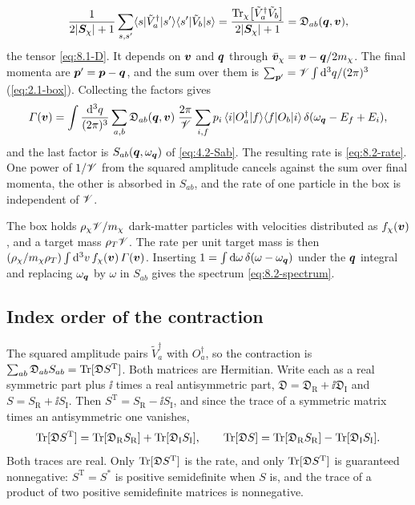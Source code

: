 \begin{equation*}
  \frac{1}{2|\bm{S}_\chi| + 1}\sum_{s,s'}\langle s|\tilde V_a^\dagger|s'\rangle\langle s'|\tilde V_b|s\rangle = \frac{\operatorname{Tr}_\chi\bigl[\tilde V_a^\dagger\tilde V_b\bigr]}{2|\bm{S}_\chi| + 1} = \mathfrak{D}_{ab}(\bm{q},\bm{v}) ,
\end{equation*}
the tensor \cref{eq:8.1-D}. It depends on $\bm{v}$ and $\bm{q}$ through $\bar{\bm{v}}_\chi = \bm{v} - \bm{q}/2m_{\chi}$. The final momenta are $\bm{p}' = \bm{p} - \bm{q}$, and the sum over them is $\sum_{\bm{p}'} = \mathscr{V}\int\mathrm{d}^3q/(2\pi)^3$ (\cref{eq:2.1-box}). Collecting the factors gives
\begin{equation*}
  \varGamma(\bm{v}) = \int\frac{\mathrm{d}^3q}{(2\pi)^3}\sum_{a,b}\mathfrak{D}_{ab}(\bm{q},\bm{v})\;\frac{2\pi}{\mathscr{V}}\sum_{i,f}p_i\,\langle i|O_a^\dagger|f\rangle\langle f|O_b|i\rangle\,\delta(\omega_{\bm{q}} - E_f + E_i) ,
\end{equation*}
and the last factor is $S_{ab}(\bm{q},\omega_{\bm{q}})$ of \cref{eq:4.2-Sab}. The resulting rate is \cref{eq:8.2-rate}. One power of $1/\mathscr{V}$ from the squared amplitude cancels against the sum over final momenta, the other is absorbed in $S_{ab}$, and the rate of one particle in the box is independent of $\mathscr{V}$.

The box holds $\rho_\chi \mathscr{V}/m_{\chi}$ dark-matter particles with velocities distributed as $f_\chi(\bm{v})$, and a target mass $\rho_T\mathscr{V}$. The rate per unit target mass is then $(\rho_\chi/m_{\chi}\rho_T)\int\mathrm{d}^3v\,f_\chi(\bm{v})\,\varGamma(\bm{v})$. Inserting $1 = \int\mathrm{d}\omega\,\delta(\omega - \omega_{\bm{q}})$ under the $\bm{q}$ integral and replacing $\omega_{\bm{q}}$ by $\omega$ in $S_{ab}$ gives the spectrum \cref{eq:8.2-spectrum}.

\subsection{Index order of the contraction}

The squared amplitude pairs $\tilde V_a^\dagger$ with $O_a^\dagger$, so the contraction is $\sum_{ab}\mathfrak{D}_{ab}S_{ab} = \operatorname{Tr}[\mathfrak{D}S^{\mathrm{T}}]$. Both matrices are Hermitian. Write each as a real symmetric part plus $\ii$ times a real antisymmetric part, $\mathfrak{D} = \mathfrak{D}_{\mathrm{R}} + \ii\mathfrak{D}_{\mathrm{I}}$ and $S = S_{\mathrm{R}} + \ii S_{\mathrm{I}}$. Then $S^{\mathrm{T}} = S_{\mathrm{R}} - \ii S_{\mathrm{I}}$, and since the trace of a symmetric matrix times an antisymmetric one vanishes,
\begin{equation*}
  \operatorname{Tr}[\mathfrak{D}S^{\mathrm{T}}] = \operatorname{Tr}[\mathfrak{D}_{\mathrm{R}}S_{\mathrm{R}}] + \operatorname{Tr}[\mathfrak{D}_{\mathrm{I}}S_{\mathrm{I}}], \qquad
  \operatorname{Tr}[\mathfrak{D}S] = \operatorname{Tr}[\mathfrak{D}_{\mathrm{R}}S_{\mathrm{R}}] - \operatorname{Tr}[\mathfrak{D}_{\mathrm{I}}S_{\mathrm{I}}] .
\end{equation*}
Both traces are real. Only $\operatorname{Tr}[\mathfrak{D}S^{\mathrm{T}}]$ is the rate, and only $\operatorname{Tr}[\mathfrak{D}S^{\mathrm{T}}]$ is guaranteed nonnegative: $S^{\mathrm{T}} = S^*$ is positive semidefinite when $S$ is, and the trace of a product of two positive semidefinite matrices is nonnegative.

